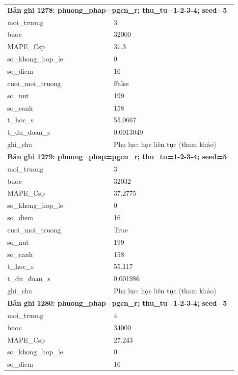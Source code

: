 \begin{longtable}{p{0.43\linewidth}p{0.50\linewidth}}
\midrule
\multicolumn{2}{p{0.95\linewidth}}{\textbf{Bản ghi 1278: phuong\_phap=pgcn\_r; thu\_tu=1-2-3-4; seed=5}} \\
moi\_\allowbreak truong & 3 \\
buoc & 32000 \\
MAPE\_\allowbreak Csp & 37.3 \\
so\_\allowbreak khong\_\allowbreak hop\_\allowbreak le & 0 \\
so\_\allowbreak diem & 16 \\
cuoi\_\allowbreak moi\_\allowbreak truong & False \\
so\_\allowbreak nut & 199 \\
so\_\allowbreak canh & 158 \\
t\_\allowbreak hoc\_\allowbreak s & 55.0667 \\
t\_\allowbreak du\_\allowbreak doan\_\allowbreak s & 0.0013049 \\
ghi\_\allowbreak chu & Phụ lục: học liên tục (tham khảo) \\
\midrule
\multicolumn{2}{p{0.95\linewidth}}{\textbf{Bản ghi 1279: phuong\_phap=pgcn\_r; thu\_tu=1-2-3-4; seed=5}} \\
moi\_\allowbreak truong & 3 \\
buoc & 32032 \\
MAPE\_\allowbreak Csp & 37.2775 \\
so\_\allowbreak khong\_\allowbreak hop\_\allowbreak le & 0 \\
so\_\allowbreak diem & 16 \\
cuoi\_\allowbreak moi\_\allowbreak truong & True \\
so\_\allowbreak nut & 199 \\
so\_\allowbreak canh & 158 \\
t\_\allowbreak hoc\_\allowbreak s & 55.117 \\
t\_\allowbreak du\_\allowbreak doan\_\allowbreak s & 0.001986 \\
ghi\_\allowbreak chu & Phụ lục: học liên tục (tham khảo) \\
\midrule
\multicolumn{2}{p{0.95\linewidth}}{\textbf{Bản ghi 1280: phuong\_phap=pgcn\_r; thu\_tu=1-2-3-4; seed=5}} \\
moi\_\allowbreak truong & 4 \\
buoc & 34000 \\
MAPE\_\allowbreak Csp & 27.243 \\
so\_\allowbreak khong\_\allowbreak hop\_\allowbreak le & 0 \\
so\_\allowbreak diem & 16 \\

\end{longtable}

